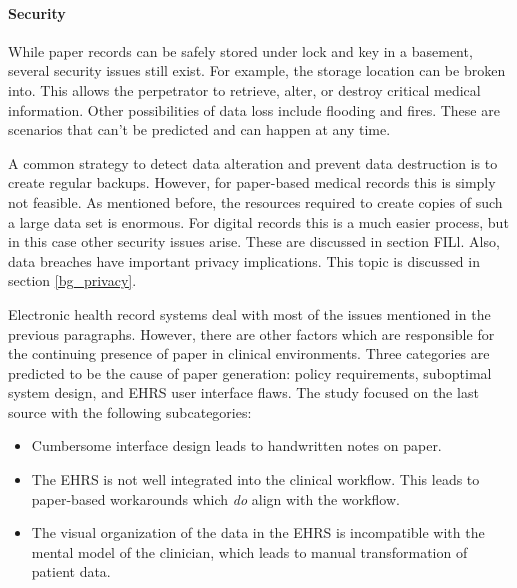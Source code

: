     \paragraph{Security} While paper records can be safely stored under lock and key in a basement, several security issues still exist. For example, the storage location can be broken into. This allows the perpetrator to retrieve, alter, or destroy critical medical information. Other possibilities of data loss include flooding and fires. These are scenarios that can't be predicted and can happen at any time. 

    A common strategy to detect data alteration and prevent data destruction is to create regular backups. However, for paper-based medical records this is simply not feasible. As mentioned before, the resources required to create copies of such a large data set is enormous. For digital records this is a much easier process, but in this case other security issues arise. These are discussed in section FILl. Also, data breaches have important privacy implications. This topic is discussed in section \ref{bg_privacy}.\bigskip %

    \noindent Electronic health record systems deal with most of the issues mentioned in the previous paragraphs. However, there are other factors which are responsible for the continuing presence of paper in clinical environments. Three categories are predicted to be the cause of paper generation: policy requirements, suboptimal system design, and EHRS user interface flaws\cite{Saleem2009}. The study focused on the last source with the following subcategories:
    \begin{itemize}
        \item Cumbersome interface design leads to handwritten notes on paper.
        \item The EHRS is not well integrated into the clinical workflow. This leads to paper-based workarounds which \emph{do} align with the workflow.
        \item The visual organization of the data in the EHRS is incompatible with the mental model of the clinician, which leads to manual transformation of patient data.
    \end{itemize}

